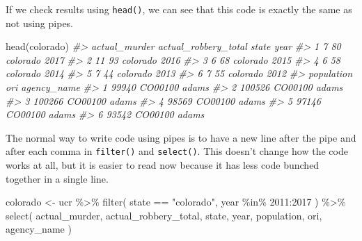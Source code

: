 \documentclass[
]{krantz}
\makeatletter
\newenvironment{Shaded}{\begin{snugshade}}{\end{snugshade}}
\newcommand{\CommentTok}[1]{\textcolor[rgb]{0.37,0.37,0.37}{\textit{#1}}}
\newcommand{\DecValTok}[1]{\textcolor[rgb]{0.06,0.06,0.06}{#1}}
\newcommand{\FunctionTok}[1]{\textcolor[rgb]{0,0,0}{#1}}
\newcommand{\NormalTok}[1]{#1}
\newcommand{\OtherTok}[1]{\textcolor[rgb]{0.37,0.37,0.37}{#1}}
\newcommand{\SpecialCharTok}[1]{\textcolor[rgb]{0,0,0}{#1}}
\newcommand{\StringTok}[1]{\textcolor[rgb]{0.5,0.5,0.5}{#1}}
\newenvironment{kframe}{%
\medskip{}
\setlength{\fboxsep}{.8em}
 \def\at@end@of@kframe{}%
 \ifinner\ifhmode%
  \def\at@end@of@kframe{\end{minipage}}%
  \begin{minipage}{\columnwidth}%
 \fi\fi%
 \def\FrameCommand##1{\hskip\@totalleftmargin \hskip-\fboxsep
 \colorbox{shadecolor}{##1}\hskip-\fboxsep
     \hskip-\linewidth \hskip-\@totalleftmargin \hskip\columnwidth}%
 \MakeFramed {\advance\hsize-\width
   \@totalleftmargin\z@ \linewidth\hsize
   \@setminipage}}%
 {\par\unskip\endMakeFramed%
 \at@end@of@kframe}
\renewenvironment{Shaded}{\begin{kframe}}{\end{kframe}}
\makeatother
\begin{document}
If we check results using \texttt{head()}, we can see that
this code is exactly the same as not using pipes.

\begin{Shaded}
\begin{Highlighting}[]
\FunctionTok{head}\NormalTok{(colorado)}
\CommentTok{\#\textgreater{}   actual\_murder actual\_robbery\_total    state year}
\CommentTok{\#\textgreater{} 1             7                   80 colorado 2017}
\CommentTok{\#\textgreater{} 2            11                   93 colorado 2016}
\CommentTok{\#\textgreater{} 3             6                   68 colorado 2015}
\CommentTok{\#\textgreater{} 4             6                   58 colorado 2014}
\CommentTok{\#\textgreater{} 5             7                   44 colorado 2013}
\CommentTok{\#\textgreater{} 6             7                   55 colorado 2012}
\CommentTok{\#\textgreater{}   population     ori agency\_name}
\CommentTok{\#\textgreater{} 1      99940 CO00100       adams}
\CommentTok{\#\textgreater{} 2     100526 CO00100       adams}
\CommentTok{\#\textgreater{} 3     100266 CO00100       adams}
\CommentTok{\#\textgreater{} 4      98569 CO00100       adams}
\CommentTok{\#\textgreater{} 5      97146 CO00100       adams}
\CommentTok{\#\textgreater{} 6      93542 CO00100       adams}
\end{Highlighting}
\end{Shaded}

The normal way to write code using pipes is to have a new
line after the pipe and after each comma in
\texttt{filter()} and \texttt{select()}. This doesn't change
how the code works at all, but it is easier to read now
because it has less code bunched together in a single line.

\begin{Shaded}
\begin{Highlighting}[]
\NormalTok{colorado }\OtherTok{\textless{}{-}}\NormalTok{ ucr }\SpecialCharTok{\%\textgreater{}\%}
  \FunctionTok{filter}\NormalTok{(}
\NormalTok{    state }\SpecialCharTok{==} \StringTok{"colorado"}\NormalTok{,}
\NormalTok{    year }\SpecialCharTok{\%in\%} \DecValTok{2011}\SpecialCharTok{:}\DecValTok{2017}
\NormalTok{  ) }\SpecialCharTok{\%\textgreater{}\%}
  \FunctionTok{select}\NormalTok{(}
\NormalTok{    actual\_murder,}
\NormalTok{    actual\_robbery\_total,}
\NormalTok{    state,}
\NormalTok{    year,}
\NormalTok{    population,}
\NormalTok{    ori,}
\NormalTok{    agency\_name}
\NormalTok{  )}
\end{Highlighting}
\end{Shaded}
\end{document}
